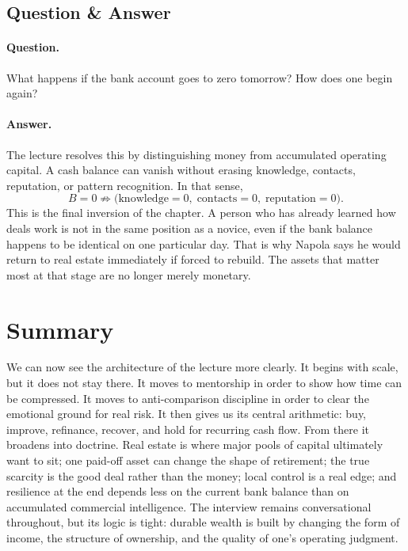 \subsection{Question \& Answer}

\paragraph{Question.}
What happens if the bank account goes to zero tomorrow? How does one begin again?

\paragraph{Answer.}
The lecture resolves this by distinguishing money from accumulated operating capital. A cash balance can vanish without erasing knowledge, contacts, reputation, or pattern recognition. In that sense,
\begin{equation}
B = 0 \not\Rightarrow
\bigl(
\text{knowledge}=0,\;
\text{contacts}=0,\;
\text{reputation}=0
\bigr).
\end{equation}
This is the final inversion of the chapter. A person who has already learned how deals work is not in the same position as a novice, even if the bank balance happens to be identical on one particular day. That is why Napola says he would return to real estate immediately if forced to rebuild. The assets that matter most at that stage are no longer merely monetary.

\section{Summary}

We can now see the architecture of the lecture more clearly. It begins with scale, but it does not stay there. It moves to mentorship in order to show how time can be compressed. It moves to anti-comparison discipline in order to clear the emotional ground for real risk. It then gives us its central arithmetic: buy, improve, refinance, recover, and hold for recurring cash flow. From there it broadens into doctrine. Real estate is where major pools of capital ultimately want to sit; one paid-off asset can change the shape of retirement; the true scarcity is the good deal rather than the money; local control is a real edge; and resilience at the end depends less on the current bank balance than on accumulated commercial intelligence. The interview remains conversational throughout, but its logic is tight: durable wealth is built by changing the form of income, the structure of ownership, and the quality of one's operating judgment.